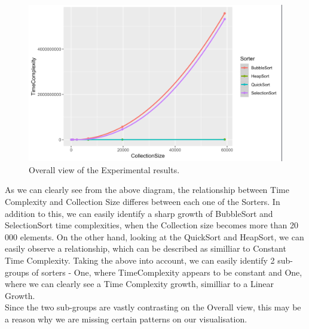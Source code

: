 \documentclass[]{report}
\begin{document}
\begin{(algorithm}
\begin{figure}
	\centering
	\includegraphics[width=0.7\linewidth]{ResultsOverallView}
	\caption[Figure 3.1:]{Overall view of the Experimental results.}
	\label{fig:resultsoverallview}
\end{figure}
\newpage
As we can clearly see from the above diagram, the relationship between Time Complexity and Collection Size differes between each one of the Sorters. In addition to this, we can easily identify a sharp growth of BubbleSort and SelectionSort time complexities, when the Collection size becomes more than 20 000 elements. On the other hand, looking at the QuickSort and HeapSort, we can easily observe a relationship, which can be described as similliar to Constant Time Complexity.
Taking the above into account, we can easily identify 2 sub-groups of sorters - One, where  TimeComplexity appears to be constant and One, where we can clearly see a Time Complexity growth, similliar to a Linear Growth.\\
Since the two sub-groups are vastly contrasting on the Overall view, this may be a reason why we are missing certain patterns on our visualisation.


\end{(algorithm}
\end{document}
